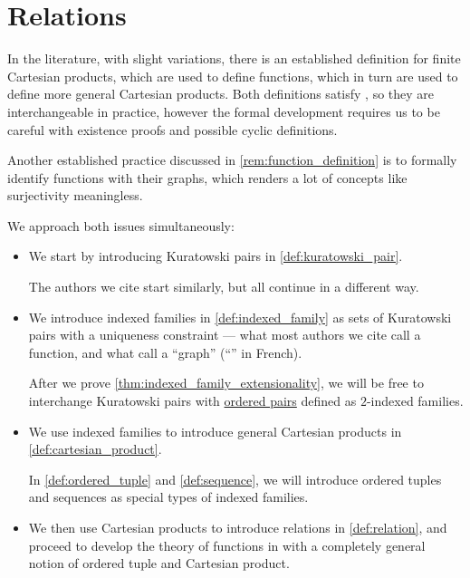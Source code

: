 \section{Relations}\label{sec:relations}

\begin{remark}\label{rem:cartesian_product_definition}
  In the literature, with slight variations, there is an established definition for finite Cartesian products, which are used to define functions, which in turn are used to define more general Cartesian products. Both definitions satisfy , so they are interchangeable in practice, however the formal development requires us to be careful with existence proofs and possible cyclic definitions.

  Another established practice discussed in \cref{rem:function_definition} is to formally identify functions with their graphs, which renders a lot of concepts like surjectivity meaningless.

  We approach both issues simultaneously:
  \begin{itemize}
    \item We start by introducing Kuratowski pairs in \cref{def:kuratowski_pair}.

    The authors we cite start similarly, but all continue in a different way.

    \item We introduce indexed families in \cref{def:indexed_family} as sets of Kuratowski pairs with a uniqueness constraint --- what most authors we cite call a function, and what \cite[def. I.3.1.1]{Bourbaki2004TheoryOfSets} call a \enquote{graph} (\enquote{} in French).

    After we prove \cref{thm:indexed_family_extensionality}, we will be free to interchange Kuratowski pairs with \hyperref[def:ordered_tuple]{ordered pairs} defined as \( 2 \)-indexed families.

    \item We use indexed families to introduce general Cartesian products in \cref{def:cartesian_product}.

    In \cref{def:ordered_tuple} and \cref{def:sequence}, we will introduce ordered tuples and sequences as special types of indexed families.

    \item We then use Cartesian products to introduce relations in \cref{def:relation}, and proceed to develop the theory of functions in  with a completely general notion of ordered tuple and Cartesian product.


\end{itemize}
\end{remark}
